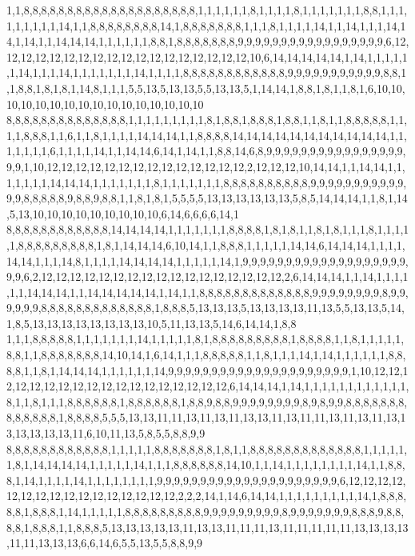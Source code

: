 1,1,8,8,8,8,8,8,8,8,8,8,8,8,8,8,8,8,8,8,8,8,1,1,1,1,1,1,8,1,1,1,1,8,1,1,1,1,1,1,1,8,8,1,1,1,1,1,1,1,1,1,14,1,1,8,8,8,8,8,8,8,8,14,1,8,8,8,8,8,8,8,1,1,1,8,1,1,1,1,14,1,1,14,1,1,1,14,14,1,14,1,1,14,14,14,1,1,1,1,1,1,8,8,1,8,8,8,8,8,8,8,9,9,9,9,9,9,9,9,9,9,9,9,9,9,9,9,9,6,12,12,12,12,12,12,12,12,12,12,12,12,12,12,12,12,12,12,10,6,14,14,14,14,14,1,14,1,1,1,1,1,1,14,1,1,1,14,1,1,1,1,1,1,1,14,1,1,1,1,8,8,8,8,8,8,8,8,8,8,8,8,9,9,9,9,9,9,9,9,9,9,9,8,8,1,1,8,8,1,8,1,8,1,14,8,1,1,1,5,5,13,5,13,13,5,5,13,13,5,1,14,14,1,8,8,1,8,1,1,8,1,6,10,10,10,10,10,10,10,10,10,10,10,10,10,10,10,10
8,8,8,8,8,8,8,8,8,8,8,8,8,8,1,1,1,1,1,1,1,1,1,8,1,8,8,1,8,8,8,1,8,8,1,1,8,1,1,8,8,8,8,8,1,1,1,1,8,8,8,1,1,6,1,1,8,1,1,1,1,14,14,14,1,1,8,8,8,8,14,14,14,14,14,14,14,14,14,14,14,1,1,1,1,1,1,1,6,1,1,1,1,14,1,1,14,14,6,14,1,14,1,1,8,8,14,6,8,9,9,9,9,9,9,9,9,9,9,9,9,9,9,9,9,9,9,1,10,12,12,12,12,12,12,12,12,12,12,12,12,12,12,2,12,12,12,10,14,14,1,1,14,14,1,1,1,1,1,1,1,14,14,14,1,1,1,1,1,1,1,8,1,1,1,1,1,1,1,8,8,8,8,8,8,8,8,8,8,9,9,9,9,9,9,9,9,9,9,9,9,9,8,8,8,8,8,9,8,8,9,8,8,1,1,8,1,8,1,5,5,5,5,13,13,13,13,13,13,5,8,5,14,14,14,1,1,8,1,14,5,13,10,10,10,10,10,10,10,10,10,6,14,6,6,6,6,14,1
8,8,8,8,8,8,8,8,8,8,8,8,14,14,14,14,1,1,1,1,1,1,1,8,8,8,8,1,8,1,8,1,1,8,1,8,1,1,1,8,1,1,1,1,1,8,8,8,8,8,8,8,8,8,1,8,1,14,14,14,6,10,14,1,1,8,8,8,1,1,1,1,1,14,14,6,14,14,14,1,1,1,1,14,14,1,1,1,14,8,1,1,1,1,14,14,14,14,1,1,1,1,1,14,1,9,9,9,9,9,9,9,9,9,9,9,9,9,9,9,9,9,9,9,9,9,6,2,12,12,12,12,12,12,12,12,12,12,12,12,12,12,12,12,12,2,6,14,14,14,1,1,14,1,1,1,1,1,1,14,14,14,1,1,14,14,14,14,14,1,14,1,1,8,8,8,8,8,8,8,8,8,8,8,8,8,9,9,9,9,9,9,9,9,8,9,9,9,9,9,9,8,8,8,8,8,8,8,8,8,8,8,8,8,1,8,8,8,5,13,13,13,5,13,13,13,13,11,13,5,5,13,13,5,14,1,8,5,13,13,13,13,13,13,13,13,10,5,11,13,13,5,14,6,14,14,1,8,8
1,1,1,8,8,8,8,8,1,1,1,1,1,1,1,14,1,1,1,1,1,8,1,8,8,8,8,8,8,8,8,8,1,8,8,8,8,1,1,8,1,1,1,1,1,8,8,1,1,8,8,8,8,8,8,8,14,10,14,1,6,14,1,1,1,8,8,8,8,8,1,1,8,1,1,1,14,1,14,1,1,1,1,1,1,8,8,8,8,1,1,8,1,14,14,14,1,1,1,1,1,1,14,9,9,9,9,9,9,9,9,9,9,9,9,9,9,9,9,9,9,9,9,9,1,10,12,12,12,12,12,12,12,12,12,12,12,12,12,12,12,12,12,12,6,14,14,14,1,14,1,1,1,1,1,1,1,1,1,1,1,1,8,1,1,8,1,1,1,8,8,8,8,8,8,1,8,8,8,8,8,8,1,8,8,9,8,8,9,9,9,9,9,9,9,9,8,9,8,9,9,8,8,8,8,8,8,8,8,8,8,8,8,8,1,8,8,8,8,5,5,5,13,13,11,11,13,11,13,11,13,13,11,13,11,11,13,11,13,11,13,13,13,13,13,13,11,6,10,11,13,5,8,5,5,8,8,9,9
8,8,8,8,8,8,8,8,8,8,8,8,1,1,1,1,1,8,8,8,8,8,8,8,1,8,1,1,8,8,8,8,8,8,8,8,8,8,8,8,8,1,1,1,1,1,1,8,1,14,14,14,14,1,1,1,1,1,14,1,1,1,8,8,8,8,8,8,14,10,1,1,14,1,1,1,1,1,1,1,1,14,1,1,8,8,8,1,14,1,1,1,1,14,1,1,1,1,1,1,1,1,9,9,9,9,9,9,9,9,9,9,9,9,9,9,9,9,9,9,9,9,9,6,12,12,12,12,12,12,12,12,12,12,12,12,12,12,12,12,2,2,2,14,1,14,6,14,14,1,1,1,1,1,1,1,1,1,14,1,8,8,8,8,8,1,8,8,8,1,14,1,1,1,1,1,8,8,8,8,8,8,8,8,8,9,9,9,9,9,9,9,9,9,8,9,9,9,9,9,9,9,8,8,8,9,8,8,8,8,1,8,8,8,1,1,8,8,8,5,13,13,13,13,13,11,13,13,11,11,11,13,11,11,11,11,11,13,13,13,13,11,11,13,13,13,6,6,14,6,5,5,13,5,5,8,8,9,9
